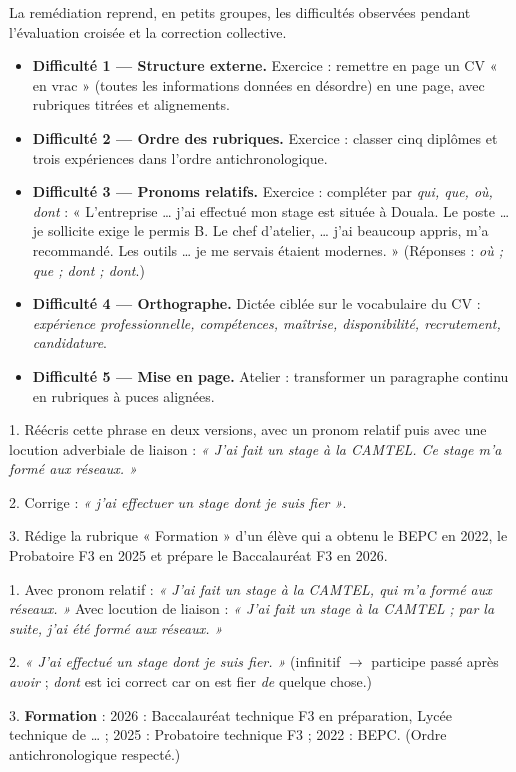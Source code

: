 \documentclass[11pt]{article}
\newcounter{popsec}
\newcounter{popsub}
\newcommand{\courssub}[1]{%
  \stepcounter{popsub}%
  \par\vspace{9pt}\noindent{\popxbold\fontsize{11.5}{13}\selectfont\color{popink}{\color{poporange}\thepopsec.\thepopsub}\hspace{6pt}#1}\par\nopagebreak\vspace{4pt}
}
\begin{document}
\courssub{Remédiation ciblée}

La remédiation reprend, en petits groupes, les difficultés observées pendant l'évaluation croisée et la correction collective.

\begin{itemize}
\item \textbf{Difficulté 1 — Structure externe.} Exercice : remettre en page un CV « en vrac » (toutes les informations données en désordre) en une page, avec rubriques titrées et alignements.
\item \textbf{Difficulté 2 — Ordre des rubriques.} Exercice : classer cinq diplômes et trois expériences dans l'ordre antichronologique.
\item \textbf{Difficulté 3 — Pronoms relatifs.} Exercice : compléter par \emph{qui, que, où, dont} : « L'entreprise \ldots{} j'ai effectué mon stage est située à Douala. Le poste \ldots{} je sollicite exige le permis B. Le chef d'atelier, \ldots{} j'ai beaucoup appris, m'a recommandé. Les outils \ldots{} je me servais étaient modernes. » (Réponses : \emph{où ; que ; dont ; dont}.)
\item \textbf{Difficulté 4 — Orthographe.} Dictée ciblée sur le vocabulaire du CV : \emph{expérience professionnelle, compétences, maîtrise, disponibilité, recrutement, candidature}.
\item \textbf{Difficulté 5 — Mise en page.} Atelier : transformer un paragraphe continu en rubriques à puces alignées.
\end{itemize}

\begin{exercice}
1. Réécris cette phrase en deux versions, avec un pronom relatif puis avec une locution adverbiale de liaison : \emph{« J'ai fait un stage à la CAMTEL. Ce stage m'a formé aux réseaux. »}\par
2. Corrige : \emph{« j'ai effectuer un stage dont je suis fier »}.\par
3. Rédige la rubrique « Formation » d'un élève qui a obtenu le BEPC en 2022, le Probatoire F3 en 2025 et prépare le Baccalauréat F3 en 2026.
\end{exercice}

\begin{corrige}
1. Avec pronom relatif : \emph{« J'ai fait un stage à la CAMTEL, qui m'a formé aux réseaux. »} Avec locution de liaison : \emph{« J'ai fait un stage à la CAMTEL ; par la suite, j'ai été formé aux réseaux. »}\par
2. \emph{« J'ai effectué un stage dont je suis fier. »} (infinitif $\rightarrow$ participe passé après \emph{avoir} ; \emph{dont} est ici correct car on est fier \emph{de} quelque chose.)\par
3. \textbf{Formation} : 2026 : Baccalauréat technique F3 en préparation, Lycée technique de \ldots{} ; 2025 : Probatoire technique F3 ; 2022 : BEPC. (Ordre antichronologique respecté.)
\end{corrige}
\end{document}
